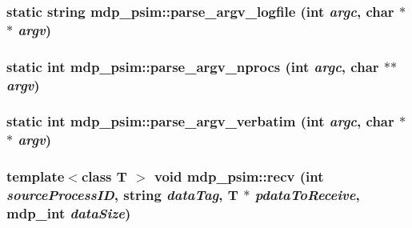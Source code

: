 \label{classmdp__psim_a6377b54cc52e570452c048e5a97b8030}
\hypertarget{classmdp__psim_ae6815490edb20ce0d984be55c1fed4f7}{
\subsubsection[{parse\_\-argv\_\-logfile}]{\setlength{\rightskip}{0pt plus 5cm}static string mdp\_\-psim::parse\_\-argv\_\-logfile (int {\em argc}, \/  char $\ast$$\ast$ {\em argv})}}
\label{classmdp__psim_ae6815490edb20ce0d984be55c1fed4f7}
\hypertarget{classmdp__psim_a6f8125eea8f0f0bbd54304db894be50d}{
\subsubsection[{parse\_\-argv\_\-nprocs}]{\setlength{\rightskip}{0pt plus 5cm}static int mdp\_\-psim::parse\_\-argv\_\-nprocs (int {\em argc}, \/  char $\ast$$\ast$ {\em argv})}}
\label{classmdp__psim_a6f8125eea8f0f0bbd54304db894be50d}
\hypertarget{classmdp__psim_acb1e64aadc39fa7deeb4e87b36f7cd3c}{
\subsubsection[{parse\_\-argv\_\-verbatim}]{\setlength{\rightskip}{0pt plus 5cm}static int mdp\_\-psim::parse\_\-argv\_\-verbatim (int {\em argc}, \/  char $\ast$$\ast$ {\em argv})}}
\label{classmdp__psim_acb1e64aadc39fa7deeb4e87b36f7cd3c}
\hypertarget{classmdp__psim_a1007797bc1b823b5f7f9bde424ed8765}{
\subsubsection[{recv}]{\setlength{\rightskip}{0pt plus 5cm}template$<$class T $>$ void mdp\_\-psim::recv (int {\em sourceProcessID}, \/  string {\em dataTag}, \/  T $\ast$ {\em pdataToReceive}, \/  {\bf mdp\_\-int} {\em dataSize})}}
